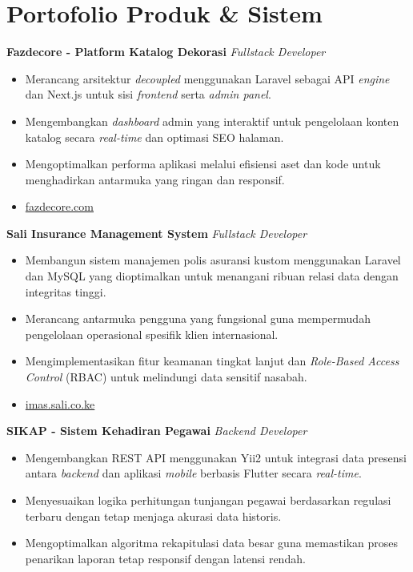 \documentclass[11pt,a4paper]{article}
\begin{document}
\section*{Portofolio Produk \& Sistem}

\textbf{Fazdecore - Platform Katalog Dekorasi} \hfill \textit{Fullstack Developer}
\begin{itemize}
    \item Merancang arsitektur \textit{decoupled} menggunakan Laravel sebagai API \textit{engine} dan Next.js untuk sisi \textit{frontend} serta \textit{admin panel}.
    \item Mengembangkan \textit{dashboard} admin yang interaktif untuk pengelolaan konten katalog secara \textit{real-time} dan optimasi SEO halaman.
    \item Mengoptimalkan performa aplikasi melalui efisiensi aset dan kode untuk menghadirkan antarmuka yang ringan dan responsif.
    \item \href{https://fazdecore.com/}{fazdecore.com}
\end{itemize}

\textbf{Sali Insurance Management System} \hfill \textit{Fullstack Developer}
\begin{itemize}
    \item Membangun sistem manajemen polis asuransi kustom menggunakan Laravel dan MySQL yang dioptimalkan untuk menangani ribuan relasi data dengan integritas tinggi.
    \item Merancang antarmuka pengguna yang fungsional guna mempermudah pengelolaan operasional spesifik klien internasional.
    \item Mengimplementasikan fitur keamanan tingkat lanjut dan \textit{Role-Based Access Control} (RBAC) untuk melindungi data sensitif nasabah.
    \item \href{https://imas.sali.co.ke/}{imas.sali.co.ke}
\end{itemize}

\textbf{SIKAP - Sistem Kehadiran Pegawai} \hfill \textit{Backend Developer}
\begin{itemize}
    \item Mengembangkan REST API menggunakan Yii2 untuk integrasi data presensi antara \textit{backend} dan aplikasi \textit{mobile} berbasis Flutter secara \textit{real-time}.
    \item Menyesuaikan logika perhitungan tunjangan pegawai berdasarkan regulasi terbaru dengan tetap menjaga akurasi data historis.
    \item Mengoptimalkan algoritma rekapitulasi data besar guna memastikan proses penarikan laporan tetap responsif dengan latensi rendah.
\end{itemize}
\end{document}

